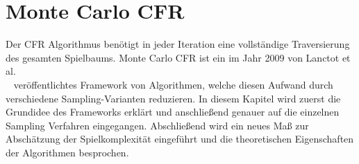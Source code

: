 \section{Monte Carlo CFR}

Der CFR Algorithmus benötigt in jeder Iteration eine vollständige Traversierung des gesamten Spielbaums.
Monte Carlo CFR ist ein im Jahr 2009 von Lanctot et al.\\~\cite{lanctot2009monte} veröffentlichtes Framework von Algorithmen, welche diesen Aufwand durch verschiedene Sampling-Varianten reduzieren.
In diesem Kapitel wird zuerst die Grundidee des Frameworks erklärt und anschließend genauer auf die einzelnen Sampling Verfahren eingegangen.
Abschließend wird ein neues Maß zur Abschätzung der Spielkomplexität eingeführt und die theoretischen Eigenschaften der Algorithmen besprochen.






